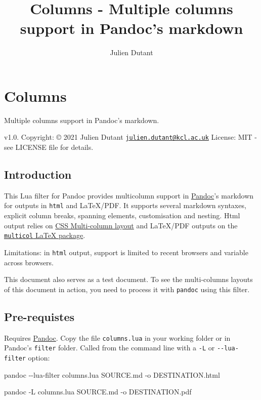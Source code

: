 \documentclass[
]{article}
\title{Columns - Multiple columns support in Pandoc's markdown}
\author{Julien Dutant}
\date{}
\newenvironment{Shaded}{}{}
\newcommand{\AttributeTok}[1]{\textcolor[rgb]{0.49,0.56,0.16}{#1}}
\newcommand{\ExtensionTok}[1]{#1}
\newcommand{\NormalTok}[1]{#1}
\begin{document}
\maketitle

\hypertarget{columns}{%
\section{Columns}\label{columns}}

Multiple columns support in Pandoc's markdown.

v1.0. Copyright: © 2021 Julien Dutant
\href{mailto:julien.dutant@kcl.ac.uk}{\nolinkurl{julien.dutant@kcl.ac.uk}}
License: MIT - see LICENSE file for details.

\hypertarget{introduction}{%
\subsection{Introduction}\label{introduction}}

This Lua filter for Pandoc provides multicolumn support in
\href{https://pandoc.org/}{Pandoc}'s markdown for outputs in
\texttt{html} and LaTeX/PDF. It supports several markdown syntaxes,
explicit column breaks, spanning elements, customisation and nesting.
Html output relies on \href{https://drafts.csswg.org/css-multicol}{CSS
Multi-column layout} and LaTeX/PDF outputs on the
\href{https://www.ctan.org/pkg/multicol}{\texttt{multicol} LaTeX
package}.

Limitations: in \texttt{html} output, support is limited to recent
browsers and variable across browsers.

This document also serves as a test document. To see the multi-columns
layouts of this document in action, you need to process it with
\texttt{pandoc} using this filter.

\hypertarget{pre-requistes}{%
\subsection{Pre-requistes}\label{pre-requistes}}

Requires \href{https://pandoc.org/}{Pandoc}. Copy the file
\texttt{columns.lua} in your working folder or in Pandoc's
\texttt{filter} folder. Called from the command line with a \texttt{-L}
or \texttt{-\/-lua-filter} option:

\begin{Shaded}
\begin{Highlighting}[]
\ExtensionTok{pandoc} \AttributeTok{{-}{-}lua{-}filter}\NormalTok{ columns.lua SOURCE.md }\AttributeTok{{-}o}\NormalTok{ DESTINATION.html}

\ExtensionTok{pandoc} \AttributeTok{{-}L}\NormalTok{ columns.lua SOURCE.md }\AttributeTok{{-}o}\NormalTok{ DESTINATION.pdf}
\end{Highlighting}
\end{Shaded}
\end{document}
